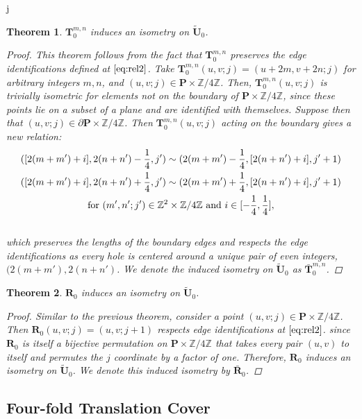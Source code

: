 j\documentclass[]{article}
\newtheorem{thm}{Theorem}[subsection]
\begin{document}
\begin{thm}$\mathbf{T}^{m,n}_{0}$ induces an isometry on $\tilde{\mathbf{U}}_0$.
\begin{proof}
This theorem follows from the fact that $\mathbf{T}^{m,n}_{0}$ preserves the edge identifications defined at $\eqref{eq:rel2}$. Take $\mathbf{T}^{m,n}_{0}(u,v;j)=(u+2m,v+2n;j)$ for arbitrary integers $m,n$, and $(u,v;j)\in\mathbf{P}\times\mathbb{Z}/4\mathbb{Z}$. Then, $\mathbf{T}^{m,n}_{0}(u,v;j)$ is trivially isometric for elements not on the boundary of $\mathbf{P}\times\mathbb{Z}/4\mathbb{Z}$, since these points lie on a subset of a plane and are identified with themselves. Suppose then that $(u,v;j)\in\partial\mathbf{P}\times\mathbb{Z}/4\mathbb{Z}$. Then $\mathbf{T}^{m,n}_{0}(u,v;j)$ acting on the boundary gives a new relation:
\begin{multline*}
([2(m+m')+i], 2(n+n')-\frac{1}{4},j')\sim(2(m+m')-\frac{1}{4},[2(n+n')+i],j'+1)\\
([2(m+m')+i], 2(n+n')+\frac{1}{4},j')\sim(2(m+m')+\frac{1}{4},[2(n+n')+i],j'+1)\\
\vspace{0.2in}\text{for } (m',n';j') \in \mathbb{Z}^{2}\times\mathbb{Z}/4\mathbb{Z}\text{ and }i\in[-\frac{1}{4},\frac{1}{4}],
\end{multline*}
which preserves the lengths of the boundary edges and respects the edge identifications as every hole is centered around a unique pair of even integers, $(2(m+m'),2(n+n')$. We denote the induced isometry on $\tilde{\mathbf{U}}_0$ as $\bar{\mathbf{T}}^{m,n}_{0}$.
\end{proof}
\end{thm}

\begin{thm}$\mathbf{R}_{0}$ induces an isometry on $\tilde{\mathbf{U}}_0$.
\begin{proof}
Similar to the previous theorem, consider a point $(u,v;j)\in\mathbf{P}\times\mathbb{Z}/4\mathbb{Z}$. Then $\mathbf{R}_{0}(u,v;j)=(u,v;j+1)$ respects edge identifications at $\eqref{eq:rel2}$. since $\mathbf{R}_{0}$ is itself a bijective permutation on $\mathbf{P}\times\mathbb{Z}/4\mathbb{Z}$ that takes every pair $(u,v)$ to itself and permutes the $j$ coordinate by a factor of one. Therefore, $\mathbf{R}_{0}$ induces an isometry on $\tilde{\mathbf{U}}_0$. We denote this induced isometry by $\bar{\mathbf{R}}_{0}$.
\end{proof}
\end{thm}

\subsection{Four-fold Translation Cover}
\end{document}
